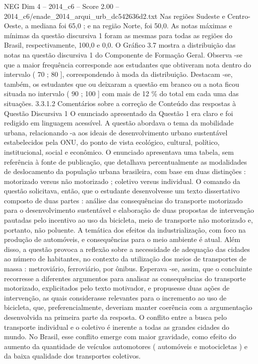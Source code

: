 \begin{textsample}{NEG Dim 4 – 2014\_c6 – Score 2.00 – 2014\_c6/enade\_2014\_arqui\_urb\_dc542636d2.txt}
Nas regiões Sudeste e Centro-Oeste, a mediana foi 65,0 ; e na região Norte, foi 50,0.
As notas máximas e mínimas da questão discursiva 1 foram as mesmas para todas as regiões do Brasil, respectivamente, 100,0 e 0,0.
O Gráfico 3.7 mostra a distribuição das notas na questão discursiva 1 do Componente de Formação Geral.
Observa -se que a maior frequência corresponde aos estudantes que obtiveram nota dentro do intervalo ( 70 ; 80 ], correspondendo à moda da distribuição.
Destacam -se, também, os estudantes que ou deixaram a questão em branco ou a nota ficou situada no intervalo ( 90 ; 100 ] com mais de 12 \% do total em cada uma das situações. 3.3.1.2 Comentários sobre a correção de Conteúdo das respostas à Questão Discursiva 1 O enunciado apresentado da Questão 1 era claro e foi redigido em linguagem acessível.
A questão abordava o tema da mobilidade urbana, relacionando -a aos ideais de desenvolvimento urbano sustentável estabelecidos pela ONU, do ponto de vista ecológico, cultural, político, institucional, social e econômico.
O enunciado apresentava uma tabela, sem referência à fonte de publicação, que detalhava percentualmente as modalidades de deslocamento da população urbana brasileira, com base em duas distinções : motorizado versus não motorizado ; coletivo versus individual.
O comando da questão solicitava, então, que o estudante desenvolvesse um texto dissertativo composto de duas partes : análise das consequências do transporte motorizado para o desenvolvimento sustentável e elaboração de duas propostas de intervenção pautadas pelo incentivo ao uso da bicicleta, meio de transporte não motorizado e, portanto, não poluente.
A temática dos efeitos da industrialização, com foco na produção de automóveis, e consequências para o meio ambiente é atual.
Além disso, a questão provoca a reflexão sobre a necessidade de adequação das cidades ao número de habitantes, no contexto da utilização dos meios de transportes de massa : metroviário, ferroviário, por ônibus.
Esperava -se, assim, que o concluinte recorresse a diferentes argumentos para analisar as consequências do transporte motorizado, explicitados pelo texto motivador, e propusesse duas ações de intervenção, as quais considerasse relevantes para o incremento ao uso de bicicleta, que, preferencialmente, deveriam manter coerência com a argumentação desenvolvida na primeira parte da resposta.
O conflito entre a busca pelo transporte individual e o coletivo é inerente a todas as grandes cidades do mundo.
No Brasil, esse conflito emerge com maior gravidade, como efeito do aumento da quantidade de veículos automotores ( automóveis e motocicletas ) e da baixa qualidade dos transportes coletivos.

\end{textsample}
